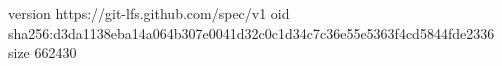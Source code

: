 version https://git-lfs.github.com/spec/v1
oid sha256:d3da1138eba14a064b307e0041d32c0c1d34c7c36e55e5363f4cd5844fde2336
size 662430
